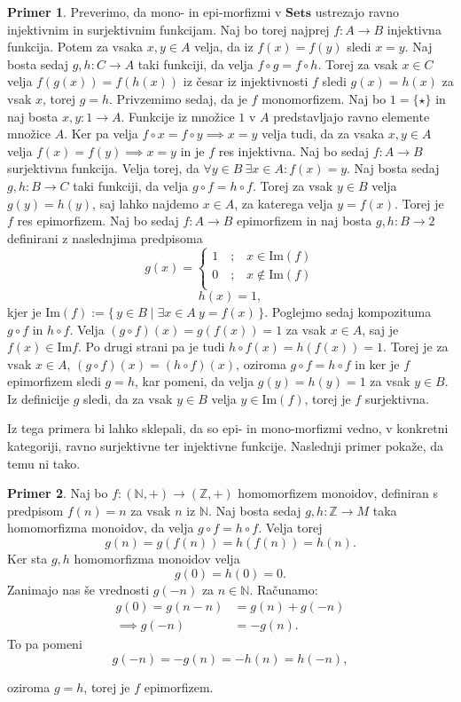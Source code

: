 \documentclass[12pt,a4paper]{book}
\theoremstyle{definition}
\theoremstyle{plain}
\theoremstyle{definition}
\newtheorem{primer}{Primer}[section]
\theoremstyle{remark}
\newcommand{\cat}[1]{\textbf{#1}}
\renewcommand{\set}[1]{\{\,#1\,\}}
\begin{document}
\begin{primer}
Preverimo, da mono- in epi-morfizmi v $\cat{Sets}$ ustrezajo ravno injektivnim in surjektivnim funkcijam. Naj bo torej najprej $f : A \to B$ injektivna funkcija. Potem za vsaka $x,y \in A$ velja, da iz $f(x) = f(y)$ sledi $x = y$. Naj bosta sedaj $g,h : C \to A$ taki funkciji, da velja $f \circ g = f \circ h$. Torej za vsak $x \in C$ velja $f(g(x)) = f(h(x))$ iz česar iz injektivnosti $f$ sledi $g(x) = h(x)$ za vsak $x$, torej $g = h$. 
Privzemimo sedaj, da je $f$ monomorfizem. Naj bo $1 = \{\star\}$ in naj bosta $x,y : 1 \to A$. Funkcije iz množice $1$ v $A$ predstavljajo ravno elemente množice $A$. Ker pa velja $f \circ x = f \circ y \implies x = y$ velja tudi, da za vsaka $x,y \in A$ velja $f(x) = f(y) \implies x = y$ in je $f$ res injektivna. Naj bo sedaj $f : A \rightarrow B$ surjektivna funkcija. Velja torej, da $\forall y \in B \ \exists x \in A : f(x) = y$. Naj bosta sedaj $g,h : B \to C$ taki funkciji, da velja $g \circ f = h \circ f$. Torej za vsak $y \in B$ velja $g(y) = h(y)$, saj lahko najdemo $x \in A$, za katerega velja $y = f(x)$. Torej je $f$ res epimorfizem. Naj bo sedaj $f : A \to B$ epimorfizem in naj bosta $g,h : B \to 2$ definirani z naslednjima predpisoma
\[
g(x)=
\begin{cases}
1 \quad\text{;}\quad x \in \mathrm{Im}(f) \\
0 \quad\text{;}\quad x \notin \mathrm{Im}(f) \\
\end{cases}
\]
$$ h(x) = 1,$$
kjer je $\mathrm{Im}(f) := \set{y \in B \mid \exists x \in A \ y = f(x)}$.
Poglejmo sedaj kompozituma $g \circ f$ in $h \circ f$. Velja $(g \circ f)(x) = g(f(x)) = 1$ za vsak $x \in A$, saj je $f(x) \in \mathrm{Im}f$. Po drugi strani pa je tudi $h \circ f(x) = h(f(x)) = 1$. Torej je za vsak $x \in A$, $(g \circ f)(x) = (h \circ f)(x)$, oziroma $g\circ f = h\circ f$ in ker je $f$ epimorfizem sledi $g = h$, kar pomeni, da velja $g(y) = h(y) = 1$ za vsak $y \in B$. Iz definicije $g$ sledi, da za vsak $y \in B$ velja $y \in \mathrm{Im}(f)$, torej je $f$ surjektivna.
\end{primer}

Iz tega primera bi lahko sklepali, da so epi- in mono-morfizmi vedno, v konkretni kategoriji, ravno surjektivne ter injektivne funkcije. Naslednji primer pokaže, da temu ni tako.

\begin{primer}
Naj bo $f : (\mathbb{N},+) \to (\mathbb{Z},+)$ homomorfizem monoidov, definiran s predpisom $f(n) = n$ za vsak $n$ iz $\mathbb{N}$. Naj bosta sedaj $g,h: \mathbb{Z} \to M$ taka homomorfizma monoidov, da velja $g \circ f = h \circ f$. 
Velja torej
$$g(n) = g(f(n)) = h(f(n)) = h(n).$$
Ker sta $g,h$ homomorfizma monoidov velja
$$g(0) = h(0) = 0.$$
Zanimajo nas še vrednosti $g(-n)$ za $n \in \mathbb{N}$. 
Računamo:
\begin{align*}
g(0) = g(n - n) &= g(n) + g(-n) \\
\implies g(-n) &= -g(n).
\end{align*}
To pa pomeni
$$g(-n) = -g(n) = -h(n) = h(-n),$$

oziroma $g = h$, torej je $f$ epimorfizem.
\end{primer}
\end{document}
